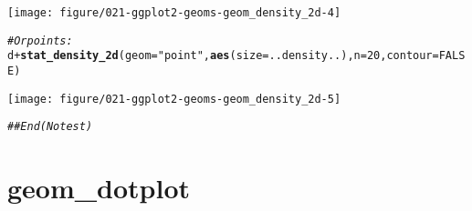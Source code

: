 \documentclass[a4paper,titlepage]{tufte-handout}\usepackage[]{graphicx}\usepackage[]{color}
\makeatletter
\def\maxwidth{ %
  \ifdim\Gin@nat@width>\linewidth
    \linewidth
  \else
    \Gin@nat@width
  \fi
}
\newcommand{\hlnum}[1]{\textcolor[rgb]{0.686,0.059,0.569}{#1}}%
\newcommand{\hlstr}[1]{\textcolor[rgb]{0.192,0.494,0.8}{#1}}%
\newcommand{\hlcom}[1]{\textcolor[rgb]{0.678,0.584,0.686}{\textit{#1}}}%
\newcommand{\hlopt}[1]{\textcolor[rgb]{0,0,0}{#1}}%
\newcommand{\hlstd}[1]{\textcolor[rgb]{0.345,0.345,0.345}{#1}}%
\newcommand{\hlkwc}[1]{\textcolor[rgb]{0.333,0.667,0.333}{#1}}%
\newcommand{\hlkwd}[1]{\textcolor[rgb]{0.737,0.353,0.396}{\textbf{#1}}}%
\newenvironment{kframe}{%
 \def\at@end@of@kframe{}%
 \ifinner\ifhmode%
  \def\at@end@of@kframe{\end{minipage}}%
  \begin{minipage}{\columnwidth}%
 \fi\fi%
 \def\FrameCommand##1{\hskip\@totalleftmargin \hskip-\fboxsep
 \colorbox{shadecolor}{##1}\hskip-\fboxsep
     \hskip-\linewidth \hskip-\@totalleftmargin \hskip\columnwidth}%
 \MakeFramed {\advance\hsize-\width
   \@totalleftmargin\z@ \linewidth\hsize
   \@setminipage}}%
 {\par\unskip\endMakeFramed%
 \at@end@of@kframe}
\newenvironment{knitrout}{}{} %
\makeatother
\begin{document}
\begin{knitrout}
\begin{kframe}
\begin{alltt}
\end{alltt}
\end{kframe}
\texttt{[image: figure/021-ggplot2-geoms-geom\_density\_2d-4]} 
\begin{kframe}\begin{alltt}
\hlcom{# Or points:}
\hlstd{d} \hlopt{+} \hlkwd{stat_density_2d}\hlstd{(}\hlkwc{geom} \hlstd{=} \hlstr{"point"}\hlstd{,} \hlkwd{aes}\hlstd{(}\hlkwc{size} \hlstd{= ..density..),} \hlkwc{n} \hlstd{=} \hlnum{20}\hlstd{,} \hlkwc{contour} \hlstd{=} \hlnum{FALSE}\hlstd{)}
\end{alltt}
\end{kframe}
\texttt{[image: figure/021-ggplot2-geoms-geom\_density\_2d-5]} 
\begin{kframe}\begin{alltt}
\hlcom{## End(No test)}
\end{alltt}
\end{kframe}
\end{knitrout}


\section{geom\_dotplot}
\end{document}
